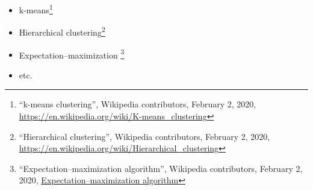 \documentclass[10pt]{article}
\newif\ifen
\newif\ifde
\newcommand{\en}[1]{\ifen#1\fi}
\newcommand{\de}[1]{\ifde#1\fi}
\begin{document}
				\de{\noindent Folgende unüberwachte Lernalgorithmen können zur Gruppierung verwendet werden:}
				\en{\noindent The following unsupervised learning algorithms can be used for clustering:}
				
				\begin{itemize}
					\item k-means\footnote{``k-means clustering'', Wikipedia contributors, February 2, 2020, \url{https://en.wikipedia.org/wiki/K-means_clustering}}
					\item Hierarchical clustering\footnote{``Hierarchical clustering'', Wikipedia contributors, February 2, 2020, \url{https://en.wikipedia.org/wiki/Hierarchical_clustering}}
					\item Expectation–maximization \footnote{``Expectation–maximization algorithm'', Wikipedia contributors, February 2, 2020, \url{Expectation–maximization algorithm}}
					\item etc.
				\end{itemize}
			
				\de{Eine Technik, die hierarchische Clusteranalyse (siehe Kapitel \hyperref[sec:section_validation_hierarchical classification]{``Hierarchical classification''}), wird später verwendet um die Einführung von Hierarchien zu erleichtern. Für die allgemeine Analyse, den Finden von optimalen Parametern für das Lernen von Modellen, wird diese Art des Lernens in dieser Arbeit nicht verwendet.}
				\en{One technique, hierarchical clustering (see chapter \hyperref[sec:section_validation_hierarchical classification]{``Hierarchical classification''}), is used later to facilitate the introduction of hierarchies. For the general analysis, the finding of optimal parameters for learning models, this kind of learning is not used in this thesis.}

		\label{}
\end{document}
